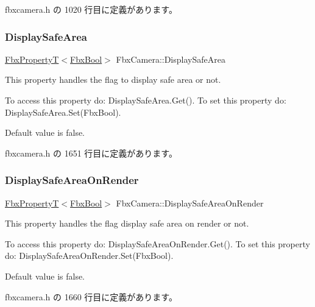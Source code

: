  fbxcamera.\+h の 1020 行目に定義があります。

\mbox{\label{class_fbx_camera_a61d982bee729eae989b1c4f49e53ef59}} 
\subsubsection{\texorpdfstring{Display\+Safe\+Area}{DisplaySafeArea}}
{\footnotesize\ttfamily \hyperlink{class_fbx_property_t}{Fbx\+PropertyT}$<$\hyperlink{fbxtypes_8h_a92e0562b2fe33e76a242f498b362262e}{Fbx\+Bool}$>$ Fbx\+Camera\+::\+Display\+Safe\+Area}

This property handles the flag to display safe area or not.

To access this property do\+: Display\+Safe\+Area.\+Get(). To set this property do\+: Display\+Safe\+Area.\+Set(\+Fbx\+Bool).

Default value is false. 

 fbxcamera.\+h の 1651 行目に定義があります。

\mbox{\label{class_fbx_camera_a6fba1dac4e237b8fb5423c6e8fdb7586}} 
\subsubsection{\texorpdfstring{Display\+Safe\+Area\+On\+Render}{DisplaySafeAreaOnRender}}
{\footnotesize\ttfamily \hyperlink{class_fbx_property_t}{Fbx\+PropertyT}$<$\hyperlink{fbxtypes_8h_a92e0562b2fe33e76a242f498b362262e}{Fbx\+Bool}$>$ Fbx\+Camera\+::\+Display\+Safe\+Area\+On\+Render}

This property handles the flag display safe area on render or not.

To access this property do\+: Display\+Safe\+Area\+On\+Render.\+Get(). To set this property do\+: Display\+Safe\+Area\+On\+Render.\+Set(\+Fbx\+Bool).

Default value is false. 

 fbxcamera.\+h の 1660 行目に定義があります。

\mbox{\label{class_fbx_camera_a935e9b57e229b7474770b0a0611a1b60}} 
